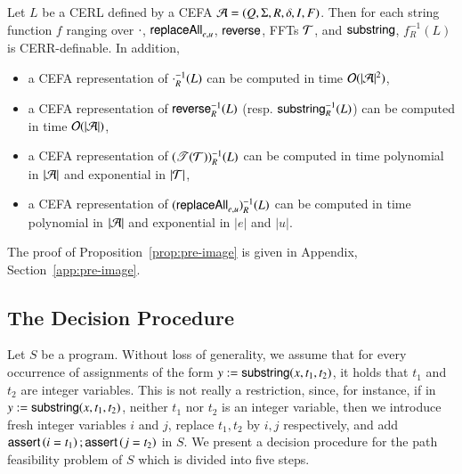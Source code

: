 \begin{proposition}\label{prop:pre-image}
Let $L$ be a CERL defined by a CEFA $\mathcal{A} = (Q, \Sigma, R, \delta, I, F)$. Then for each string function $f$ ranging over $\cdot$, $\mathsf{replaceAll}_{e,u}$, $\mathsf{reverse}$, FFTs $\mathcal{T}$, and $\mathsf{substring}$, $f^{-1}_R(L)$ is CERR-definable. In addition,
\begin{itemize}
\item a CEFA representation of $\cdot^{-1}_R(L)$ can be computed in time $\mathcal{O}(|\mathcal{A}|^2)$, 
%
\item a CEFA representation of $\mathsf{reverse}^{-1}_R(L)$ (resp. $\mathsf{substring}^{-1}_R(L)$) can be computed in time $\mathcal{O}(|\mathcal{A}|)$,
%
\item a CEFA representation of  $(\mathscr{T}(\mathcal{T}))^{-1}_R(L)$ can be computed in time polynomial in $|\mathcal{A}|$ and exponential in $|\mathcal{T}|$,
%
\item a CEFA representation of  $(\mathsf{replaceAll}_{e,u})^{-1}_R(L)$ can be computed in time polynomial in $|\mathcal{A}|$ and exponential in $|e|$ and $|u|$.
\end{itemize}
\end{proposition}

The proof of Proposition~\ref{prop:pre-image} is given in Appendix, Section~\ref{app:pre-image}.

\subsection{The Decision Procedure}\label{sec:dc}
%
Let $S$  be a {\slint} program. %
Without loss of generality, we assume that for every occurrence of assignments of the form $y:= \mathsf{substring}(x, t_1, t_2)$, it holds that $t_1$ and $t_2$ are integer variables. This is not really a restriction, since, for instance, if in $y:= \mathsf{substring}(x, t_1, t_2)$, neither $t_1$ nor $t_2$ is an integer variable, then we introduce fresh integer variables $i$ and $j$, replace $t_1, t_2$ by $i,j$ respectively, and add $\textsf{assert}\left(i=t_1\right);\textsf{assert}\left(j = t_2\right)$ in $S$.
We present a decision procedure for the path feasibility problem of $S$ which is divided into five steps. %
%

\medskip
{}%

